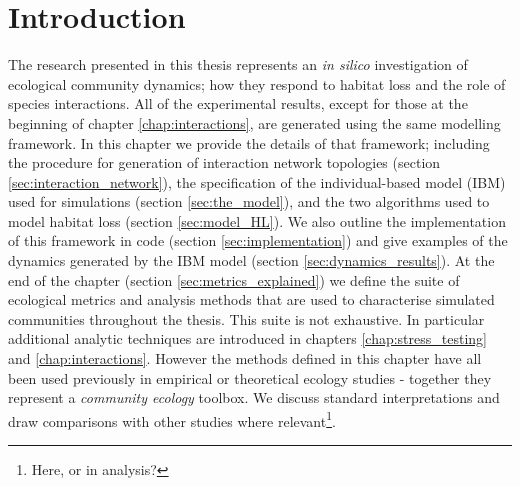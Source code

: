 

\section{Introduction}
\label{sec:methods_intro}
The research presented in this thesis represents an \emph{in silico} investigation of ecological community dynamics; how they respond to habitat loss and the role of species interactions. All of the experimental results, except for those at the beginning of chapter \ref{chap:interactions}, are generated using the same modelling framework. In this chapter we provide the details of that framework; including the procedure for generation of interaction network topologies (section \ref{sec:interaction_network}), the specification of the individual-based model (IBM) used for simulations (section \ref{sec:the_model}), and the two algorithms used to model habitat loss (section \ref{sec:model_HL}). We also outline the implementation of this framework in code (section \ref{sec:implementation}) and give examples of the dynamics generated by the IBM model (section \ref{sec:dynamics_results}). At the end of the chapter (section \ref{sec:metrics_explained}) we define the suite of ecological metrics and analysis methods that are used to characterise simulated communities throughout the thesis. This suite is not exhaustive. In particular additional analytic techniques are introduced in chapters \ref{chap:stress_testing} and \ref{chap:interactions}. However the methods defined in this chapter have all been used previously in empirical or theoretical ecology studies - together they represent a \emph{community ecology} toolbox. We discuss standard interpretations and draw comparisons with other studies where relevant\footnote{Here, or in analysis?}. 



